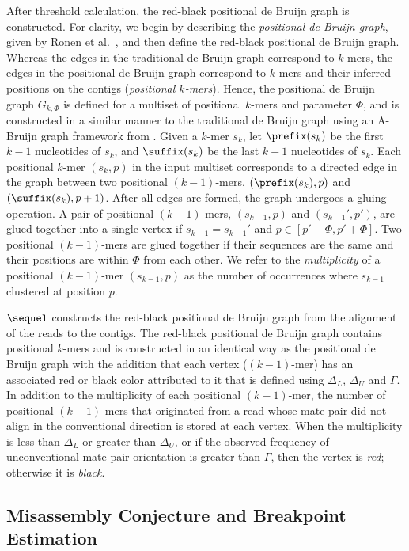 \documentclass[doctor]{thesis}
\begin{document}
After threshold calculation, the red-black positional de Bruijn graph is constructed. For clarity, we begin by describing the {\em positional de Bruijn graph}, given by Ronen et al.~\cite{sequel}, and then define the red-black positional de Bruijn graph.  Whereas the edges in the traditional de Bruijn graph correspond to $k$-mers, the edges in the positional de Bruijn graph correspond to $k$-mers and their inferred positions on the contigs ({\em positional $k$-mers}).  Hence, the positional de Bruijn graph $G_{k, \Phi}$ is defined for a multiset of positional $k$-mers and parameter $\Phi$, and is constructed in a similar manner to the traditional de Bruijn graph using an A-Bruijn graph framework from \cite{PTT04}. Given a $k$-mer $s_k$, let $\prefix(s_k)$ be the first $k - 1$ nucleotides of $s_k$, and $\suffix(s_k)$ be the last $k - 1$ nucleotides of $s_k$.  Each positional $k$-mer $(s_k, p)$ in the input multiset corresponds to a directed edge in the graph between two positional $(k - 1)$-mers, $(\prefix(s_k), p)$ and $(\suffix(s_k), p + 1)$.  After all edges are formed, the graph undergoes a gluing operation. A pair of positional $(k - 1)$-mers, $(s_{k - 1}, p)$ and $(s_{k - 1}', p')$, are glued together into a single vertex if $s_{k - 1} = s_{k - 1}'$ and $p \in [p' - \Phi, p' + \Phi]$.  Two positional $(k - 1)$-mers are glued together if their sequences are the same and their positions are within $\Phi$ from each other. We refer to the {\em multiplicity} of a positional $(k - 1)$-mer $(s_{k - 1}, p)$ as the number of occurrences where $s_{k - 1}$ clustered at position $p$.  

$\sequel$ constructs the red-black positional de Bruijn graph from the alignment of the reads to the contigs. The red-black positional de Bruijn graph contains positional $k$-mers and is constructed in an identical way as the positional de Bruijn graph with the addition that each vertex ($(k - 1)$-mer) has an associated red or black color attributed to it that is defined using $\Delta_L$, $\Delta_U$ and $\Gamma$.  In addition to the multiplicity of each positional $(k - 1)$-mer, the number of positional $(k - 1)$-mers that originated from a read whose mate-pair did not align in the conventional direction is stored at each vertex.   When the multiplicity is less than $\Delta_L$ or greater than $\Delta_U$, or if the observed frequency of unconventional mate-pair orientation is greater than $\Gamma$, then the vertex is {\em red}; otherwise it is {\em black}.

\subsection{Misassembly Conjecture and Breakpoint Estimation}  
\end{document}
